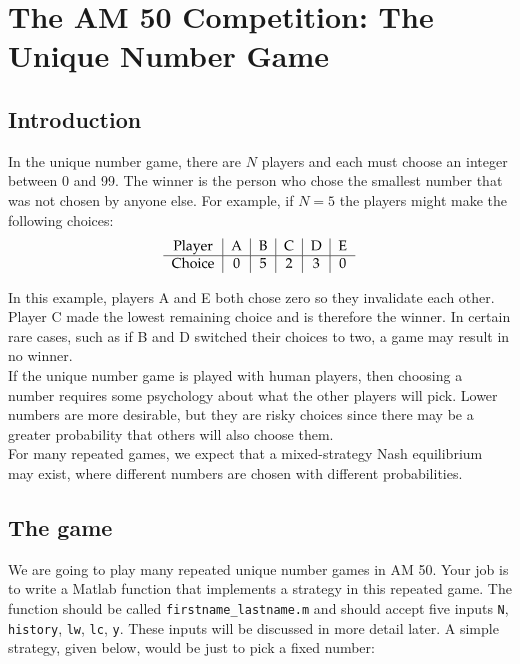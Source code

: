 \documentclass[12pt]{amsart}
\begin{document}
\section{The AM 50 Competition: The Unique Number Game}
\subsection{Introduction}
In the unique number game, there are $N$ players and each must choose an
integer between 0 and 99. The winner is the person who chose the smallest
number that was not chosen by anyone else. For example, if $N=5$ the
players might make the following choices:
\[
\begin{tabular}{c|c|c|c|c|c}
  Player & A & B & C & D & E \\
  \hline
  Choice & 0 & 5 & 2 & 3 & 0
\end{tabular}
\]

\noindent In this example, players A and E both chose zero so they invalidate each other.
Player C made the lowest remaining choice and is therefore the winner. In
certain rare cases, such as if B and D switched their choices to two, a game may
result in no winner.\\

\noindent  If the unique number game is played with human players, then choosing a number
requires some psychology about what the other players will pick. Lower numbers
are more desirable, but they are risky choices since there may be a greater
probability that others will also choose them. \\

\noindent For many repeated games, we expect that a mixed-strategy Nash equilibrium may
exist, where different numbers are chosen with different probabilities.\\

\subsection{The game}
We are going to play many repeated unique number games in AM 50. Your job is to
write a Matlab function that implements a strategy in this repeated game. The
function should be called  \texttt{firstname\_lastname.m} and should accept five inputs
\texttt{N}, \texttt{history}, \texttt{lw}, \texttt{lc}, \texttt{y}.  These inputs will be
discussed in more detail later.  A simple strategy, given 
below, would be just to pick a fixed number:
\end{document}
